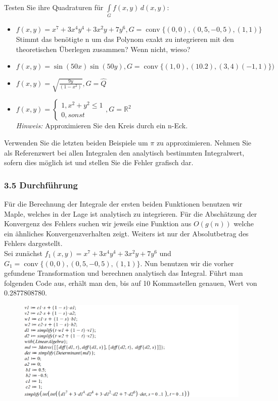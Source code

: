 \documentclass[a4paper,11pt,bibliography=totoc,listof=totoc,headinclude=true,cleardoublepage=empty,oneside]{scrbook}
\DeclareMathOperator*{\conv}{conv}
\begin{document}
Testen Sie ihre Quadraturen für $\int \limits_{G} \! f(x,y) \, d(x,y)$:

\begin{itemize}
	\renewcommand\labelitemi{-}
	\item $f(x,y)= x^7+3x^4y^4+3x^2y+7y^6 , G=\conv\{(0,0),(0,5,-0,5),(1,1)\}$\\
	Stimmt das benötigte n um das Polynom exakt zu integrieren mit den theoretischen Überlegen zusammen? Wenn nicht, wieso?
	\item $f(x,y)=\sin(50x)\sin(50y), G=\conv\{(1,0),(10.2),(3,4)(-1,1)\})$
	\item  $f(x,y)= \sqrt{\frac{9y}{(1-x^2)}} , G=\hat{Q} $
	\item $f(x,y) = \begin{cases} 
	1, x^2+y^2 \leq 1 \\
	0, sonst
	\end{cases} , G=\mathbb{R}^2$\\
	\textit{Hinweis:} Approximieren Sie den Kreis durch ein n-Eck.
\end{itemize}

\noindent Verwenden Sie die letzten beiden Beispiele um $\pi$ zu approximieren.
Nehmen Sie als Referenzwert bei allen Integralen den analytisch bestimmten Integralwert, sofern dies möglich ist und stellen Sie die Fehler grafisch dar.



\subsubsection{3.5 Durchführung}

Für die Berechnung der Integrale der ersten beiden Funktionen benutzen wir Maple, welches in der Lage ist analytisch zu integrieren. Für die Abschätzung der Konvergenz des Fehlers suchen wir jeweils eine Funktion aus $O(g(n))$ welche ein ähnliches Konvergenzverhalten zeigt. Weiters ist nur der Absolutbetrag des Fehlers dargestellt. \\

\noindent Sei zunächst $f_1(x,y)= x^7+3x^4y^4+3x^2y+7y^6$ und $G_1=\conv\{(0,0),(0,5,-0,5),(1,1)\}$. Nun benutzen wir die vorher gefundene Transformation und berechnen analytisch das Integral. Führt man folgenden Code aus, erhält man den, bis auf 10 Kommastellen genauen, Wert von 0.2877808780. 

\begin{figure}[h]
	\centering
	\includegraphics[width=1\textwidth]{mw_3_5_1.png}
\end{figure}
\end{document}

